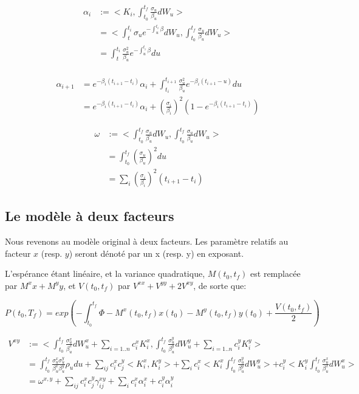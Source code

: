 \begin{align*}
\alpha_i &:=
<K_i, \int_{t_0}^{t_f} \frac{\sigma_u}{\beta_u} dW_u> \\
&=
< \int_{t}^{t_i}\sigma_u e^{-\int_u^{t_i} \beta} dW_u,
\int_{t_0}^{t_f} \frac{\sigma_u}{\beta_u} dW_u > \\
&=   \int_t^{t_i} \frac{\sigma_u^2}{\beta_u} e^{-\int_u^{t_i} \beta} du \\
\end{align*}

\begin{align*}
\alpha_{i+1}
&= e^{-\beta_i (t_{i+1} - t_i)} \alpha_i + \int_{t_i}^{t_{i+1}} \frac{\sigma_u^2}{\beta_u} e^{-\beta_i(t_{i+1} - u)} du\\
&= e^{-\beta_i (t_{i+1} - t_i)} \alpha_i + (\frac{\sigma_i}{\beta_i})^2 (1 - e^{-\beta_i(t_{i+1} - t_i)})
\end{align*}


\begin{align*}
\omega &:=
<\int_{t_0}^{t_f} \frac{\sigma_u}{\beta_u} dW_u, \int_{t_0}^{t_f} \frac{\sigma_u}{\beta_u} dW_u>\\
&= \int_{t_0}^{t_f} (\frac{\sigma_u}{\beta_u})^2 du \\
&= \sum_i  (\frac{\sigma_i}{\beta_i})^2 (t_{i+1} - t_i)
\end{align*}


\newpage

\subsection*{Le modèle à deux facteurs}
Nous revenons au modèle original à deux facteurs. Les paramètre relatifs au facteur $x$ (resp. $y$) seront dénoté par un x (resp. y) en exposant.

L'espérance étant linéaire, et la variance quadratique, 
$M(t_0, t_f)$ est remplacée par $M^x x + M^y y$, et $V(t_0, t_f)$ par $V^{xx} + V^{yy} + 2 V^{xy}$, de sorte que:

$$P(t_0, T_f) = exp(-\int_{t_0}^{t_f} \Phi - M^x(t_0, t_f) x(t_0) - M^y(t_0, t_f) y(t_0) + \frac{V(t_0, t_f)}{2})$$

\begin{align*} V^{xy} &:= <
\int_{t_0}^{t_f} \frac{\sigma^x_u}{\beta_u^x} dW_u^x+\sum_{i=1..n}c_i^x K_i^x,
\int_{t_0}^{t_f} \frac{\sigma^y_u}{\beta_u^y} dW_u^y+\sum_{i=1..n}c_i^y K_i^y> \\
&= \int_{t_0}^{t_f} \frac{\sigma_u^x \sigma_u^y}{\beta_u^x \beta_u^y} \rho_u du
+ \sum_{ij} c_i^x c_j^y <K_i^x, K_i^y>
+ \sum_i c_i^x <K_i^x \int_{t_0}^{t_f} \frac{\sigma^y_u}{\beta_u^y} dW_u^y> + c_i^y <K_i^y \int_{t_0}^{t_f} \frac{\sigma^x_u}{\beta_u^x} dW_u^x>\\
&= \omega^{x,y} + \sum_{ij} c_i^x c_j^y \gamma_{ij}^{xy}
+ \sum_i c_i^x \alpha_i^x + c_i^y \alpha_i^y
\end{align*}

